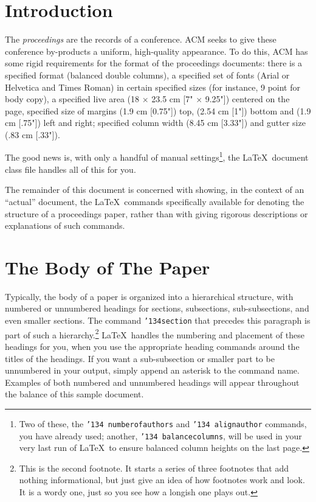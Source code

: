 \documentclass{sig-alternate-05-2015}
\begin{document}
\section{Introduction}
The \textit{proceedings} are the records of a conference.
ACM seeks to give these conference by-products a uniform,
high-quality appearance.  To do this, ACM has some rigid
requirements for the format of the proceedings documents: there
is a specified format (balanced  double columns), a specified
set of fonts (Arial or Helvetica and Times Roman) in
certain specified sizes (for instance, 9 point for body copy),
a specified live area (18 $\times$ 23.5 cm [7" $\times$ 9.25"]) centered on
the page, specified size of margins (1.9 cm [0.75"]) top, (2.54 cm [1"]) bottom
and (1.9 cm [.75"]) left and right; specified column width
(8.45 cm [3.33"]) and gutter size (.83 cm [.33"]).

The good news is, with only a handful of manual
settings\footnote{Two of these, the {\texttt{\char'134 numberofauthors}}
and {\texttt{\char'134 alignauthor}} commands, you have
already used; another, {\texttt{\char'134 balancecolumns}}, will
be used in your very last run of \LaTeX\ to ensure
balanced column heights on the last page.}, the \LaTeX\ document
class file handles all of this for you.

The remainder of this document is concerned with showing, in
the context of an ``actual'' document, the \LaTeX\ commands
specifically available for denoting the structure of a
proceedings paper, rather than with giving rigorous descriptions
or explanations of such commands.

\section{The {\secit Body} of The Paper}
Typically, the body of a paper is organized
into a hierarchical structure, with numbered or unnumbered
headings for sections, subsections, sub-subsections, and even
smaller sections.  The command \texttt{{\char'134}section} that
precedes this paragraph is part of such a
hierarchy.\footnote{This is the second footnote.  It
starts a series of three footnotes that add nothing
informational, but just give an idea of how footnotes work
and look. It is a wordy one, just so you see
how a longish one plays out.} \LaTeX\ handles the numbering
and placement of these headings for you, when you use
the appropriate heading commands around the titles
of the headings.  If you want a sub-subsection or
smaller part to be unnumbered in your output, simply append an
asterisk to the command name.  Examples of both
numbered and unnumbered headings will appear throughout the
balance of this sample document.
\end{document}
